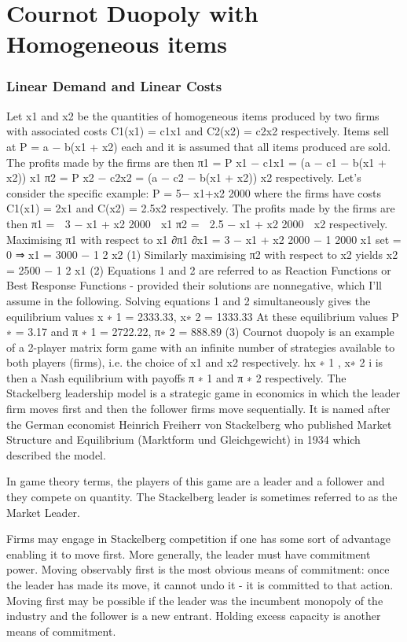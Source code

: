 \section{Cournot Duopoly with Homogeneous items}


\subsubsection{Linear Demand and Linear Costs}

Let x1 and x2 be the quantities of homogeneous items produced by two firms with associated
costs C1(x1) = c1x1 and C2(x2) = c2x2 respectively.
Items sell at P = a − b(x1 + x2) each and it is assumed that all items produced are sold.
The profits made by the firms are then
π1 = P x1 − c1x1 = (a − c1 − b(x1 + x2)) x1
π2 = P x2 − c2x2 = (a − c2 − b(x1 + x2)) x2
respectively.
Let’s consider the specific example: P = 5−
x1+x2
2000 where the firms have costs C1(x1) = 2x1
and C(x2) = 2.5x2 respectively.
The profits made by the firms are then
π1 =

3 −
x1 + x2
2000 
x1
π2 =

2.5 −
x1 + x2
2000 
x2
respectively.
Maximising π1 with respect to x1
∂π1
∂x1
= 3 −
x1 + x2
2000
−
1
2000
x1
set = 0
⇒ x1 = 3000 −
1
2
x2 (1)
Similarly maximising π2 with respect to x2 yields
x2 = 2500 −
1
2
x1 (2)
Equations 1 and 2 are referred to as Reaction Functions or Best Response Functions -
provided their solutions are nonnegative, which I’ll assume in the following.
Solving equations 1 and 2 simultaneously gives the equilibrium values
x
∗
1 = 2333.33, x∗
2 = 1333.33
At these equilibrium values
P
∗ = 3.17
and
π
∗
1 = 2722.22, π∗
2 = 888.89 (3)
Cournot duopoly is an example of a 2-player matrix form game with an infinite number
of strategies available to both players (firms), i.e. the choice of x1 and x2 respectively.
hx
∗
1
, x∗
2
i is then a Nash equilibrium with payoffs π
∗
1
and π
∗
2
respectively.
\newpage
The Stackelberg leadership model is a strategic game in economics in which the leader firm moves first and then the follower firms move sequentially. It is named after the German economist Heinrich Freiherr von Stackelberg who published Market Structure and Equilibrium (Marktform und Gleichgewicht) in 1934 which described the model.

In game theory terms, the players of this game are a leader and a follower and they compete on quantity. The Stackelberg leader is sometimes referred to as the Market Leader.

Firms may engage in Stackelberg competition if one has some sort of advantage enabling it to move first. More generally, the leader must have commitment power. Moving observably first is the most obvious means of commitment: once the leader has made its move, it cannot undo it - it is committed to that action. Moving first may be possible if the leader was the incumbent monopoly of the industry and the follower is a new entrant. Holding excess capacity is another means of commitment.

